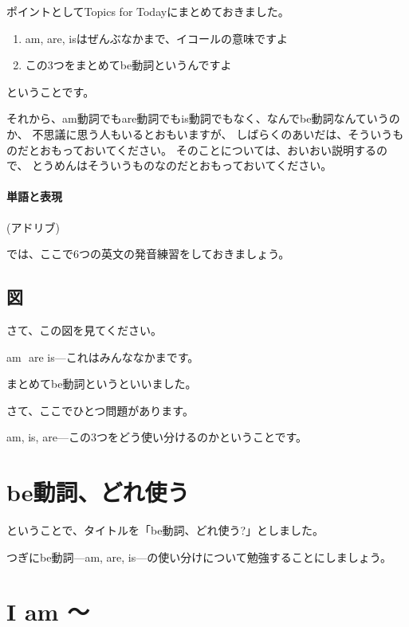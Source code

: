 \documentclass[book,jafontscale=0.9247]{jlreq}
\begin{document}
ポイントとしてTopics for Todayにまとめておきました。

\begin{enumerate}
 \item am, are, isはぜんぶなかまで、イコールの意味ですよ
 \item この3つをまとめてbe動詞というんですよ
\end{enumerate}
ということです。

それから、am動詞でもare動詞でもis動詞でもなく、なんでbe動詞なんていうのか、
不思議に思う人もいるとおもいますが、
しばらくのあいだは、そういうものだとおもっておいてください。
そのことについては、おいおい説明するので、
とうめんはそういうものなのだとおもっておいてください。

\paragraph{単語と表現} \mbox{}

(アドリブ)

では、ここで6つの英文の発音練習をしておきましょう。


{\large \ComputerMouse}
\subsection{図}
さて、この図を見てください。

am\,\,\ComputerMouse\,\,are\,\,is---これはみんななかまです。

まとめてbe動詞というといいました。

さて、ここでひとつ問題があります。

am, is, are---この3つをどう使い分けるのかということです。

{\large \ComputerMouse}
\section{be動詞、どれ使う}

ということで、タイトルを「be動詞、どれ使う?」としました。

つぎにbe動詞---am, are, is---の使い分けについて勉強することにしましょう。

{\large \ComputerMouse}

\section{I am 〜}
{\large \ComputerMouse}
\end{document}
